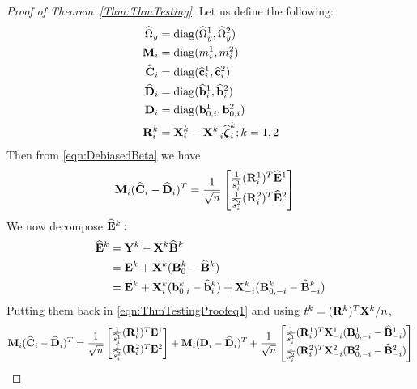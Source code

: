 \documentclass[12pt, letterpaper]{article}
\DeclareMathOperator*{\diag}{diag }
\numberwithin{equation}{section}
\begin{document}
\begin{proof}[Proof of Theorem~\ref{Thm:ThmTesting}]
Let us define the following:
%
\begin{align*}
\widehat \Omega_y &= \diag(\widehat \Omega_y^1, \widehat \Omega_y^2)\\
\bfM_i &= \diag(m^1_i, m^2_i)\\
\widehat \bfC_i &= \diag(\widehat \bfc^1_i, \widehat \bfc^2_i)\\
\widehat \bfD_i &= \diag(\widehat \bfb^1_i, \widehat \bfb^2_i)\\
\bfD_i &= \diag(\bfb^1_{0,i}, \bfb^2_{0,i})\\
\bfR_i^k &= \bfX_i^k - \bfX_{-i}^k \widehat \bfzeta_i^k; k = 1,2
\end{align*}
%
Then from \eqref{eqn:DebiasedBeta} we have
%
\begin{align}\label{eqn:ThmTestingProofeq1}
{\mathbf{M}}_i ( \widehat {{\mathbf{C}}}_i - \widehat {{\mathbf{D}}}_i )^T &= \frac{1}{\sqrt n}
\begin{bmatrix}
\frac{1}{\widehat s^1_i} ({\mathbf{R}}^1_i)^T \widehat {{\mathbf{E}}}^1 \\
\frac{1}{\widehat s^2_i} ({\mathbf{R}}^2_i)^T \widehat {{\mathbf{E}}}^2
\end{bmatrix}
\end{align}
%
We now decompose $\widehat {{\mathbf{E}}}^k:$
%
\begin{align*}
\widehat {{\mathbf{E}}}^k &= {\mathbf{Y}}^k - {\mathbf{X}}^k \widehat {{\mathbf{B}}}^k \\
&= {\mathbf{E}}^k + {\mathbf{X}}^k ({\mathbf{B}}_0^k - \widehat {{\mathbf{B}}}^k)\\
&= {\mathbf{E}}^k + {\mathbf{X}}_i^k ({\bf{b}}_{0,i}^k - \widehat {{\bf{b}}}_i^k) + {\mathbf{X}}_{-i}^k ({\mathbf{B}}_{0,-i}^k - \widehat {{\mathbf{B}}}_{-i}^k)
\end{align*}
%
Putting them back in \eqref{eqn:ThmTestingProofeq1} and using $t^k = ({\mathbf{R}}^k)^T {\mathbf{X}}^k/n$,
%
\begin{align}
\bfM_i ( \widehat \bfC_i - \widehat \bfD_i)^T &= \frac{1}{\sqrt n}
\begin{bmatrix}
\frac{1}{\widehat s^1_i} (\bfR^1_i)^T \bfE^1 \\
\frac{1}{\widehat s^2_i} (\bfR^2_i)^T \bfE^2
\end{bmatrix} +
\bfM_i (\bfD_i - \widehat \bfD_i )^T +
\frac{1}{\sqrt n}
\begin{bmatrix}
\frac{1}{\widehat s^1_i} (\bfR^1_i)^T \bfX_{-i}^1 (\bfB_{0,-i}^1 - \widehat \bfB_{-i}^1) \\
\frac{1}{\widehat s^2_i} (\bfR^2_i)^T \bfX_{-i}^2 (\bfB_{0,-i}^2 - \widehat \bfB_{-i}^2)
\end{bmatrix} \notag\\

\end{align}
\end{proof}
\end{document}
